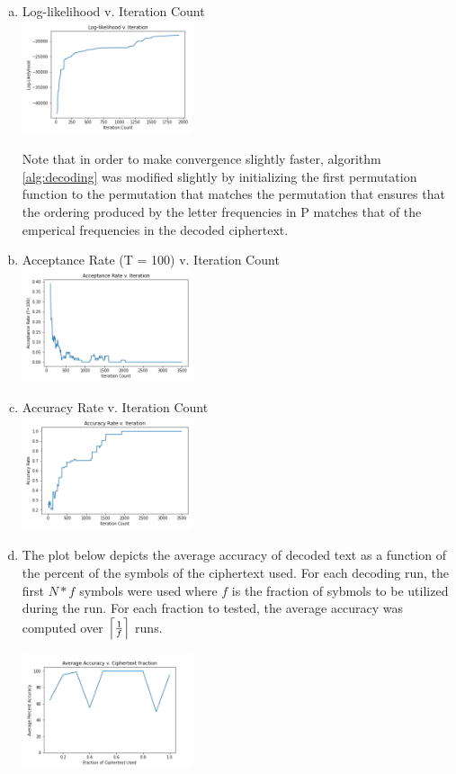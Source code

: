 \documentclass{siamart190516}
\begin{document}
\begin{enumerate}[(a)]
  \item Log-likelihood v. Iteration Count\\
        \includegraphics[width=5cm]{loglikelihoodviter.png}

        Note that in order to make convergence slightly faster, algorithm \ref{alg:decoding} was modified slightly by initializing the first permutation function to the permutation that matches the permutation that ensures that the ordering produced by the letter frequencies in P matches that of the emperical frequencies in the decoded ciphertext.

  \item Acceptance Rate (T = 100) v. Iteration Count \\
        \includegraphics[width=5cm]{acceptancerateviter.png}
  \item Accuracy Rate v. Iteration Count\\
        \includegraphics[width=5cm]{accuracyrateviter.png}
  \item The plot below depicts the average accuracy of decoded text as a function of the percent of the symbols of the ciphertext used. For each decoding run, the first $N * f$ symbols were used where $f$ is the fraction of sybmols to be utilized during the run. For each fraction to tested, the average accuracy was computed over $\left\lceil \frac{1}{f} \right\rceil$ runs.

        \includegraphics[width=5cm]{accvfrac.png}


\end{enumerate}
\end{document}
